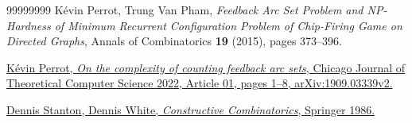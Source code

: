 \documentclass[numbers=enddot,12pt,final,onecolumn,notitlepage]{scrartcl}%
\theoremstyle{definition}
\theoremstyle{plainsl}
\begin{document}
\begin{thebibliography}{99999999}
K\'{e}vin Perrot, Trung Van Pham, \textit{Feedback
Arc Set Problem and NP-Hardness of Minimum Recurrent Configuration Problem of
Chip-Firing Game on Directed Graphs}, Annals of Combinatorics \textbf{19}
(2015), pages 373--396.

%
\href{https://arxiv.org/abs/1909.03339v2}{K\'{e}vin Perrot, \textit{On the
complexity of counting feedback arc sets}, Chicago Journal of Theoretical
Computer Science 2022, Article 01, pages 1--8, arXiv:1909.03339v2.}

%
\href{https://doi.org/10.1007/978-1-4612-4968-9}{Dennis Stanton, Dennis White,
\textit{Constructive Combinatorics}, Springer 1986.}
\end{thebibliography}
\end{document}
